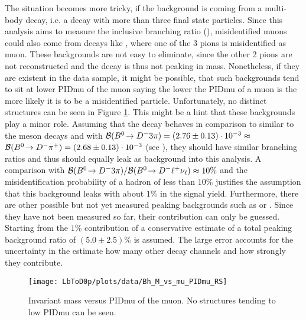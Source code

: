 The situation becomes more tricky, if the background is coming from a multi-body \Lb decay, i.e. a decay with more than three final state particles.
Since this analysis aims to measure the inclusive branching ratio \BR(\LbToDpmunuX), misidentified muons could also come from decays like \decay{\Lb}{\Dz\proton 3\pi}, where one of the 3 pions is misidentified as muon.
These backgrounds are not easy to eliminate, since the other 2 pions are not reconstructed and the decay is thus not peaking in \Dz\proton\mun mass.
Nonetheless, if they are existent in the data sample, it might be possible, that such backgrounds tend to sit at lower PIDmu of the muon saying the lower the PIDmu of a muon is the more likely it is to be a misidentified particle.
Unfortunately, no distinct structures can be seen in Figure \ref{fig:plot_D0pmuMass_vs_muPIDmu}.
This might be a hint that these backgrounds play a minor role.
Assuming that the decay \decay{\Lb}{\Dz\proton 3\pi} behaves in comparison to \decay{\Lb}{\Dz\proton\pim} similar to the meson decays \decay{\Bd}{\Dm 3\pi} and \decay{\Bd}{\Dm\pip} with 
${\cal B}({{B}^0}\!\rightarrow {\ensuremath{{D}^-}} 3\pi) = (2.76 \pm 0.13) \cdot 10^{-3} \approx$ 
${\cal B}({{B}^0}\!\rightarrow {\ensuremath{{D}^-}}{\ensuremath{{\pi}^+}}) = (2.68 \pm 0.13) \cdot 10^{-3}$ (see \cite{PDG}),
they should have similar branching ratios and thus should equally leak as background into this analysis.
A comparison with ${\cal B}({{B}^0}\!\rightarrow {\ensuremath{{D}^-}} 3\pi)/{\cal B}({{B}^0}\!\rightarrow {\ensuremath{{D}^-}}{\ensuremath{\ell^+}}{\ensuremath{{\nu}_\ell}}) \approx 10\%$ and the misidentification probability of a hadron of less than $10\%$ \cite{muonID_Performance} justifies the assumption that this background leaks with about $1\%$ in the signal yield.
Furthermore, there are other possible but not yet measured peaking backgrounds such as \decay{\Lb}{\Dz\proton\rhom} or \decay{\Lb}{\Dz\proton\pim\rhoz}.
Since they have not been measured so far, their contribution can only be guessed.
Starting from the $1\%$ contribution of \decay{\Lb}{\Dz\proton 3\pi} a conservative estimate of a total peaking background ratio of $(5.0 \pm 2.5)\%$ is assumed.
The large error accounts for the uncertainty in the estimate how many other decay channels and how strongly they contribute.
\begin{figure}[tb]
	\centering
	\texttt{[image: LbToD0p/plots/data/Bh\_M\_vs\_mu\_PIDmu\_RS]}
	\caption{Invariant \Dz\proton\mun mass versus PIDmu of the muon. No structures tending to low PIDmu can be seen.}
	\label{fig:plot_D0pmuMass_vs_muPIDmu}
\end{figure}

